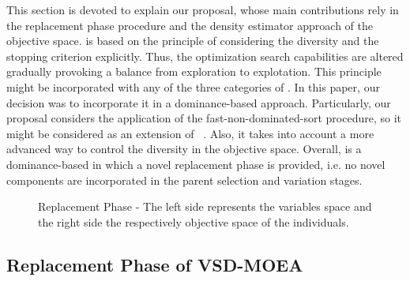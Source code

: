 This section is devoted to explain our proposal, whose main contributions rely in the replacement phase procedure and the density estimator approach of the objective space.
%
\VSDMOEA{} is based on the principle of considering the diversity and the stopping criterion explicitly.
%
Thus, the optimization search capabilities are altered gradually provoking a balance from exploration to explotation.
%
This principle might be incorporated with any of the three categories of \MOEAS{}.
%
In this paper, our decision was to incorporate it in a dominance-based approach.
%
Particularly, our proposal considers the application of the fast-non-dominated-sort procedure, so it might be considered as an extension
of \NSGAII{}~\cite{Joel:NSGAII}.
%
Also, it takes into account a more advanced way to control the diversity in the objective space.
%
%
%
Overall, \VSDMOEA{} is a dominance-based \MOEA{} in which a novel replacement phase is provided,
i.e. no novel components are incorporated in the parent selection and variation stages.
\begin{figure}[t]
\centering

\caption{Replacement Phase - The left side represents the variables space and the right side the respectively objective space of the individuals.  }
\label{fig:Hypersphere}
\end{figure}


\subsection{Replacement Phase of VSD-MOEA}

